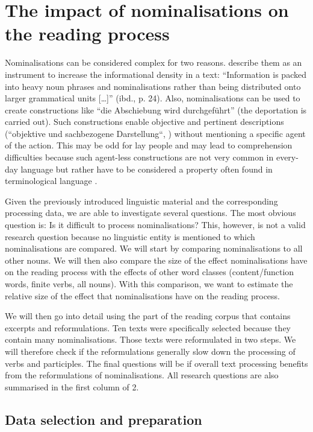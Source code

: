 \documentclass[output=paper]{langsci/langscibook}
\begin{document}
\section{\label{bkm:Ref283726002}The impact of nominalisations on the reading process}

Nominalisations can be considered complex for two reasons. \citet{Hansen2006} describe them as an instrument to increase the informational density in a text: “Information is packed into heavy noun phrases and nominalisations rather than being distributed onto larger grammatical units […]” (ibd., p. 24). Also, nominalisations can be used to create constructions like “die Abschiebung wird durchgeführt” (the deportation is carried out). Such constructions enable objective and pertinent descriptions (“objektive und sachbezogene Darstellung“, \citet[p. 169]{HansenSchirra2004}) without mentioning a specific agent of the action. This may be odd for lay people and may lead to comprehension difficulties because such agent-less constructions are not very common in every-day language but rather have to be considered a property often found in terminological language \citep[cf. ][p. 170]{HansenSchirra2004}. 

Given the previously introduced linguistic material and the corresponding processing data, we are able to investigate several questions. The most obvious question is: Is it difficult to process nominalisations? This, however, is not a valid research question because no linguistic entity is mentioned to which nominalisations are compared. We will start by comparing nominalisations to all other nouns. We will then also compare the size of the effect nominalisations have on the reading process with the effects of other word classes (content/function words, finite verbs, all nouns). With this comparison, we want to estimate the relative size of the effect that nominalisations have on the reading process.

We will then go into detail using the part of the reading corpus that contains excerpts and reformulations. Ten texts were specifically selected because they contain many nominalisations. Those texts were reformulated in two steps. We will therefore check if the reformulations generally slow down the processing of verbs and participles. The final questions will be if overall text processing benefits from the reformulations of nominalisations. All research questions are also summarised in the first column of 2.

\subsection{\label{wolfer:sec:3.1}Data selection and preparation}
\end{document}
